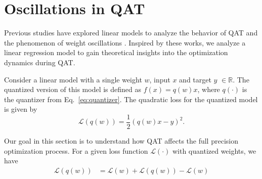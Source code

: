 \section{Oscillations in QAT}
\label{sec:motivation}


Previous studies have explored linear models to analyze the behavior of QAT and the phenomenon of weight oscillations \cite{pseudoQuantNoise, nagel2022overcoming, vitoscillations, gupta2023reducing}. Inspired by these works, we analyze a linear regression model to gain theoretical insights into the optimization dynamics during QAT.

Consider a linear model with a single weight \( w \), input \( x \) and target \( y \) $\in \mathbb{R}$. The quantized version of this model is defined as \( f(x) = q(w) x \), where \( q(\cdot) \) is the quantizer from Eq.~\ref{eq:quantizer}. The quadratic loss for the quantized model is given by
\begin{equation}
   \mathcal{L}(q(w)) = \frac{1}{2}(q(w)x - y)^2.
\end{equation}

Our goal in this section is to understand how QAT affects the full precision optimization process. For a given loss function $\mathcal{L}(\cdot)$ with quantized weights, we have 
\begin{align}
    \mathcal{L}(q(w)) &= \mathcal{L}(w) + \mathcal{L}(q(w)) - \mathcal{L}(w)
\end{align}

